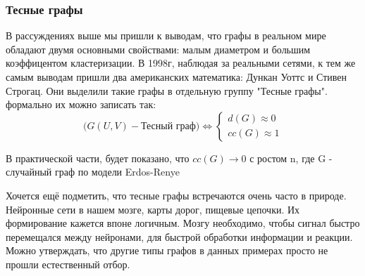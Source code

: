 \subsubsection{Тесные графы}
    В рассуждениях выше мы пришли к выводам, что графы в реальном мире обладают
двумя основными свойствами: малым диаметром и большим коэффицентом кластеризации.
В 1998г, наблюдая за реальными сетями, к тем же самым выводам пришли два американских 
математика: Дункан Уоттс и Стивен Строгац. Они выделили такие графы в отдельную группу
"Тесные графы". формально их можно записать так:
\begin{equation*}
    \bigg(G(U, V) - \text{Тесный граф}\bigg) \Leftrightarrow
    \begin{cases}
        d(G) \approx 0 \\
        cc(G) \approx 1
    \end{cases}
\end{equation*}

В практической части, будет показано, что $cc(G) \rightarrow 0$ с ростом n, где G - случайный граф
по модели Erdos-Renye

Хочется ещё подметить, что тесные графы встречаются очень часто в природе.
Нейронные сети в нашем мозге, карты дорог, пищевые цепочки. Их формирование кажется
впоне логичным. Мозгу необходимо, чтобы сигнал быстро перемещался между нейронами,
для быстрой обработки информации и реакции. Можно утверждать, что другие типы графов
в данных примерах просто не прошли естественный отбор.















